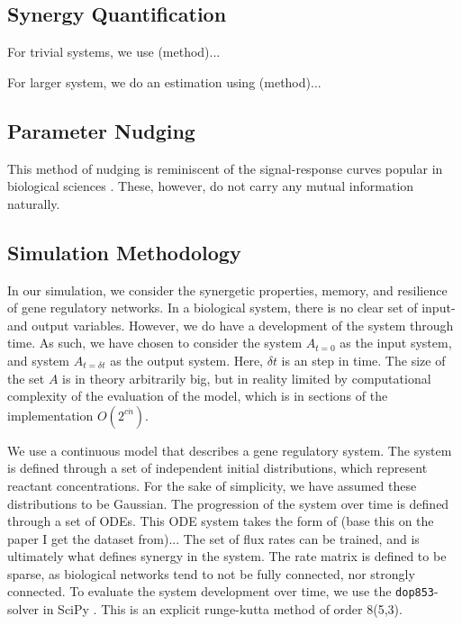\documentclass[../main.tex]{subfiles}
\begin{document}
\subsection{Synergy Quantification}

For trivial systems, we use (method)...

For larger system, we do an estimation using (method)...

\subsection{Parameter Nudging}


This method of nudging is reminiscent of the signal-response curves popular in biological sciences \cite{tyson2010functional}.
These, however, do not carry any mutual information naturally.

\subsection{Simulation Methodology}

In our simulation, we consider the synergetic properties, memory, and resilience of gene regulatory networks.
In a biological system, there is no clear set of input- and output variables.
However, we do have a development of the system through time.
As such, we have chosen to consider the system $A_{t=0}$ as the input system, and system $A_{t=\delta t}$ as the output system.
Here, $\delta t$ is an step in time. %
The size of the set $A$ is in theory arbitrarily big, but in reality limited by computational complexity of the evaluation of the model, which is in sections of the implementation $O(2^{c \dot n})$.

We use a continuous model that describes a gene regulatory system.
The system is defined through a set of independent initial distributions, which represent reactant concentrations.
For the sake of simplicity, we have assumed these distributions to be Gaussian.
The progression of the system over time is defined through a set of ODEs.
This ODE system takes the form of (base this on the paper I get the dataset from)...
The set of flux rates can be trained, and is ultimately what defines synergy in the system.
The rate matrix is defined to be sparse, as biological networks tend to not be fully connected, nor strongly connected.
To evaluate the system development over time, we use the \texttt{dop853}-solver in SciPy \cite{scipy}.
This is an explicit runge-kutta method of order 8(5,3).
\end{document}

